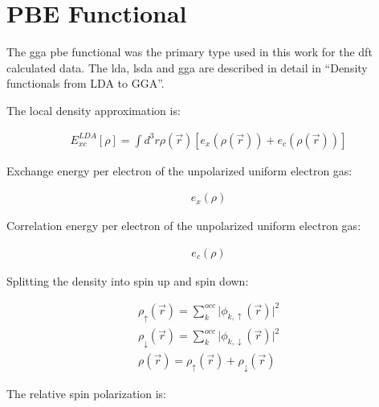 \chapter{PBE Functional}
\label{chaper:pbefunctional}

The \acrshort{gga} \acrshort{pbe} functional was the primary type used in this work for the \acrshort{dft} calculated data.  The \acrshort{lda}, \acrshort{lsda} and \acrshort{gga} are described in detail in \enquote{Density functionals from LDA to GGA}\cite{ldaggaperdew}.

The local density approximation is:

\begin{equation}
\begin{split}
E_{xc}^{LDA} [\rho] = \int d^3r \rho(\vec{r}) \left[e_x(\rho(\vec{r})) + e_c(\rho(\vec{r})) \right ]
\end{split}
\label{eq:functional1}
\end{equation}

Exchange energy per electron of the unpolarized uniform electron gas:

\begin{equation}
\begin{split}
e_x (\rho)
\end{split}
\label{eq:functional2}
\end{equation}

Correlation energy per electron of the unpolarized uniform electron gas:

\begin{equation}
\begin{split}
e_c (\rho)
\end{split}
\label{eq:functional3}
\end{equation}

Splitting the density into spin up and spin down:

\begin{equation}
\begin{split}
\rho_{\uparrow} (\vec{r}) = \sum_k^{occ} \lvert \phi_{k,\uparrow} (\vec{r}) \rvert^2 \\
\rho_{\downarrow} (\vec{r}) = \sum_k^{occ} \lvert \phi_{k,\downarrow} (\vec{r}) \rvert^2 \\
\rho(\vec{r}) = \rho_{\uparrow} (\vec{r}) + \rho_{\downarrow} (\vec{r})
\end{split}
\label{eq:functional4}
\end{equation}

The relative spin polarization is:

